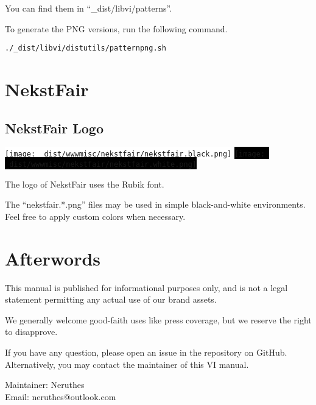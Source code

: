\documentclass[a4paper,11pt]{report}
\begin{document}
You can find them in ``\_dist/libvi/patterns''.

To generate the PNG versions, run the following command.

\begin{verbatim}
./_dist/libvi/distutils/patternpng.sh
\end{verbatim}












\chapter{NekstFair}
\section{NekstFair Logo}
\colorbox{white}{\texttt{[image: \_dist/wwwmisc/nekstfair/nekstfair.black.png]}}%
\hfill%
\colorbox{black}{\texttt{[image: \_dist/wwwmisc/nekstfair/nekstfair.white.png]}}

The logo of NekstFair uses the Rubik font.

The ``nekstfair.*.png'' files may be used in simple black-and-white environments.
Feel free to apply custom colors when necessary.






\chapter{Afterwords}
This manual is published for informational purposes only,
and is not a legal statement permitting any actual use of our brand assets.

We generally welcome good-faith uses like press coverage,
but we reserve the right to disapprove.

If you have any question, please open an issue in the repository on GitHub.
Alternatively, you may contact the maintainer of this VI manual.

Maintainer: Neruthes\\
Email: neruthes@outlook.com
\end{document}
